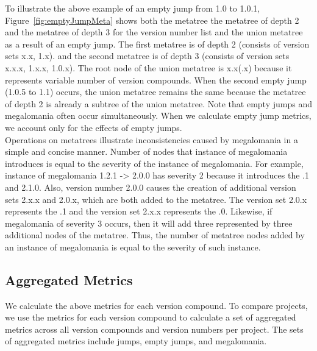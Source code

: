 \documentclass[conference]{IEEEtran}
\begin{document}
To illustrate the above example of an empty jump from 1.0 to 1.0.1, Figure~\ref{fig:emptyJumpMeta} shows both the metatree the metatree of depth 2 and the metatree of depth 3 for the version number list and the union metatree as a result of an empty jump.
The first metatree is of depth 2 (consists of version sets x.x, 1.x). and the second metatree is of depth 3 (consists of version sets x.x.x, 1.x.x, 1.0.x).
The root node of the union metatree is x.x(.x) because it represents variable number of version compounds.
When the second empty jump (1.0.5 to 1.1) occurs, the union metatree remains the same because the metatree of depth 2 is already a subtree of the union metatree. 
Note that empty jumps and megalomania often occur simultaneously.
When we calculate empty jump metrics, we account only for the effects of empty jumps. 
\\


\label{sec:MegaAndMeta}
Operations on metatrees illustrate inconsistencies caused by megalomania in a simple and concise manner. 
Number of nodes that instance of megalomania introduces is equal to the severity of the instance of megalomania. 
For example, instance of megalomania 1.2.1 -> 2.0.0 has severity 2 because it introduces the .1 and 2.1.0. 
Also, version number 2.0.0 causes the creation of additional version sets 2.x.x and 2.0.x, which are both added to the metatree.
The version set 2.0.x represents the .1 and the version set 2.x.x represents the .0. 
Likewise, if megalomania of severity 3 occurs, then it will add three \choices represented by three additional nodes of the metatree.
Thus, the number of metatree nodes added by an instance of megalomania is equal to the severity of such instance. 

\subsection{Aggregated Metrics}
We calculate the above metrics for each version compound.
To compare projects, we use the metrics for each version compound to calculate a set of aggregated metrics across all version compounds and version numbers per project.
The sets of aggregated metrics include jumps, empty jumps, and megalomania. \\
\end{document}
